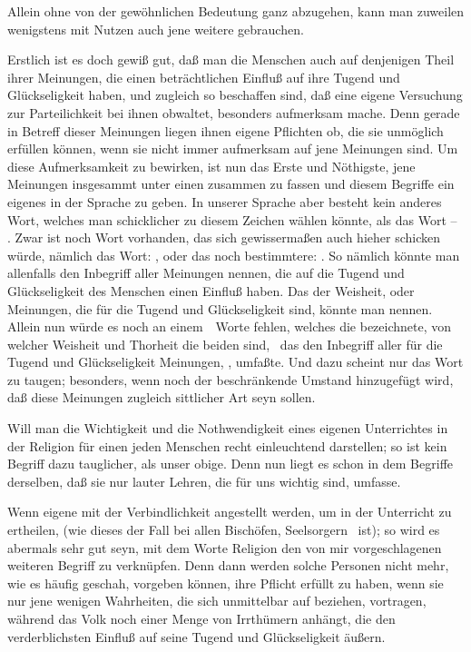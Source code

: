 \begin{aufza}
\begin{aufzb}
\end{aufzb}
\item Allein ohne von der gewöhnlichen Bedeutung ganz abzugehen, kann man zuweilen wenigstens mit Nutzen auch jene weitere gebrauchen.
\begin{aufzb}
\item Erstlich ist es doch gewiß gut, daß man die Menschen auch auf denjenigen Theil ihrer Meinungen, die einen beträchtlichen Einfluß auf ihre Tugend und Glückseligkeit haben, und zugleich so beschaffen sind, daß eine eigene Versuchung zur Parteilichkeit bei ihnen obwaltet, besonders aufmerksam mache. Denn gerade in Betreff dieser Meinungen liegen ihnen eigene Pflichten ob, die sie unmöglich erfüllen können, wenn sie nicht immer aufmerksam auf jene Meinungen sind. Um diese Aufmerksamkeit zu bewirken, ist nun das Erste und Nöthigste, jene Meinungen insgesammt unter einen  zusammen zu fassen und diesem Begriffe ein eigenes  in der Sprache zu geben. In unserer  Sprache aber besteht kein anderes Wort, welches man schicklicher zu diesem Zeichen wählen könnte, als das Wort -- . Zwar ist noch  Wort vorhanden, das sich gewissermaßen auch hieher schicken würde, nämlich das Wort: , oder das noch bestimmtere: . So nämlich könnte man allenfalls den Inbegriff aller Meinungen nennen, die auf die Tugend und Glückseligkeit des Menschen einen  Einfluß haben. Das  der Weisheit, oder Meinungen, die für die Tugend und Glückseligkeit  sind, könnte man  nennen. Allein nun würde es noch an einem~\ Worte fehlen, welches die  bezeichnete, von welcher Weisheit und Thorheit die beiden  sind, \dh\ das den Inbegriff aller für die Tugend und Glückseligkeit  Meinungen, , umfaßte. Und dazu scheint nur das Wort  zu taugen; besonders, wenn noch der beschränkende Umstand hinzugefügt wird, daß diese Meinungen zugleich sittlicher Art seyn sollen.
\item Will man die Wichtigkeit und die Nothwendigkeit eines eigenen Unterrichtes in der Religion für einen jeden Menschen recht einleuchtend darstellen; so ist kein Begriff dazu tauglicher, als unser obige. Denn nun liegt es schon in dem Begriffe derselben, daß sie nur lauter Lehren, die für uns wichtig sind, umfasse.
\item Wenn eigene  mit der Verbindlichkeit angestellt werden, um in der  Unterricht zu ertheilen, (wie dieses der Fall bei allen Bischöfen, Seelsorgern \usw\ ist); so wird es abermals sehr gut seyn, mit dem Worte Religion den von mir vorgeschlagenen weiteren Begriff zu verknüpfen. Denn dann werden solche Personen nicht mehr, wie es häufig geschah, vorgeben können, ihre Pflicht erfüllt zu haben, wenn sie nur jene wenigen Wahrheiten, die sich unmittelbar auf  beziehen, vortragen, während das Volk noch einer Menge von Irrthümern anhängt, die den verderblichsten Einfluß auf seine Tugend und Glückseligkeit äußern.

\end{aufzb}
\end{aufza}
